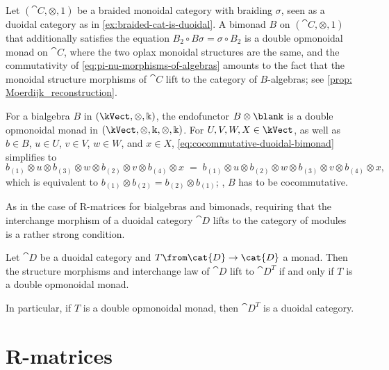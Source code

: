 \begin{example}\label{ex:bimonad-in-braided-cat-is-duoidal-bimonad}
  Let \((\cat{C}, \otimes, 1)\) be a braided monoidal category with braiding \(\sigma\),
  seen as a duoidal category as in \cref{ex:braided-cat-is-duoidal}.
  A bimonad \(B\) on \((\cat{C}, \otimes, 1)\) that additionally satisfies
  the equation \(B_2 \circ B\sigma = \sigma \circ B_2\)
  is a double opmonoidal monad on \(\cat{C}\),
  where the two oplax monoidal structures are the same,
  and the commutativity of \cref{eq:pi-nu-morphisms-of-algebras} amounts to the fact that
  the monoidal structure morphisms of \(\cat{C}\) lift to the category of \(B\)\hyp{}algebras;
  see \cref{prop: Moerdijk_reconstruction}.
\end{example}

\begin{example}\label{ex:cocommutative-bimonad}
  For a bialgebra \(B\) in \((\kVect, \otimes, \Bbbk)\),
  the endofunctor
  \(B \otimes \blank\) is a double opmonoidal monad in \((\kVect, \otimes, \Bbbk, \otimes, \Bbbk)\).
  For \(U, V, W, X \in \kVect\), as well as \(b \in B\), \(u \in U\), \(v \in V\), \(w \in W\), and \(x \in X\),
  \cref{eq:cocommutative-duoidal-bimonad} simplifies to
  \[
    b_{(1)} \otimes u \otimes b_{(3)} \otimes w \otimes b_{(2)} \otimes v \otimes b_{(4)} \otimes x
    \;=\;
    b_{(1)} \otimes u \otimes b_{(2)} \otimes w \otimes b_{(3)} \otimes v \otimes b_{(4)} \otimes x,
  \]
  which is equivalent to \(b_{(1)} \otimes b_{(2)} = b_{(2)} \otimes b_{(1)}\);
  \ie, \(B\) has to be cocommutative.
\end{example}

As in the case of R\hyp{}matrices for bialgebras and bimonads,
requiring that the interchange morphism of a duoidal category \(\cat{D}\)
lifts to the category of modules is a rather strong condition.

\begin{proposition}\label{prop:cocommutative-bimonad-lifts-duoidal-structure}
  Let \(\cat{D}\) be a duoidal category and \(T\from \cat{D}\to \cat{D}\) a monad.
  Then the structure morphisms and interchange law of \(\cat{D}\) lift to \(\cat{D}^T\)
  if and only if
  \(T\) is a double opmonoidal monad.

  In particular, if \(T\) is a double opmonoidal monad, then \(\cat{D}^T\) is a duoidal category.
\end{proposition}

\section{R-matrices}\label{sec:r-matrices}

